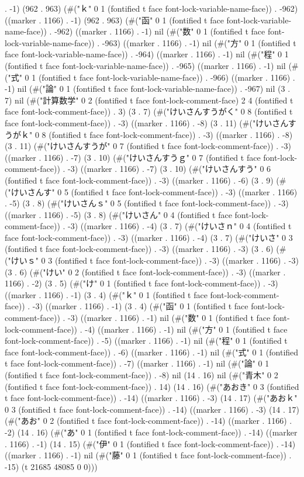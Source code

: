 . -1) (962 . 963) (#("ｋ" 0 1 (fontified t face font-lock-variable-name-face)) . -962) ((marker . 1166) . -1) (962 . 963) (#("函" 0 1 (fontified t face font-lock-variable-name-face)) . -962) ((marker . 1166) . -1) nil (#("数" 0 1 (fontified t face font-lock-variable-name-face)) . -963) ((marker . 1166) . -1) nil (#("方" 0 1 (fontified t face font-lock-variable-name-face)) . -964) ((marker . 1166) . -1) nil (#("程" 0 1 (fontified t face font-lock-variable-name-face)) . -965) ((marker . 1166) . -1) nil (#("式" 0 1 (fontified t face font-lock-variable-name-face)) . -966) ((marker . 1166) . -1) nil (#("論" 0 1 (fontified t face font-lock-variable-name-face)) . -967) nil (3 . 7) nil (#("計算数学" 0 2 (fontified t face font-lock-comment-face) 2 4 (fontified t face font-lock-comment-face)) . 3) (3 . 7) (#("けいさんすうがく" 0 8 (fontified t face font-lock-comment-face)) . -3) ((marker . 1166) . -8) (3 . 11) (#("けいさんすうがｋ" 0 8 (fontified t face font-lock-comment-face)) . -3) ((marker . 1166) . -8) (3 . 11) (#("けいさんすうが" 0 7 (fontified t face font-lock-comment-face)) . -3) ((marker . 1166) . -7) (3 . 10) (#("けいさんすうｇ" 0 7 (fontified t face font-lock-comment-face)) . -3) ((marker . 1166) . -7) (3 . 10) (#("けいさんすう" 0 6 (fontified t face font-lock-comment-face)) . -3) ((marker . 1166) . -6) (3 . 9) (#("けいさんす" 0 5 (fontified t face font-lock-comment-face)) . -3) ((marker . 1166) . -5) (3 . 8) (#("けいさんｓ" 0 5 (fontified t face font-lock-comment-face)) . -3) ((marker . 1166) . -5) (3 . 8) (#("けいさん" 0 4 (fontified t face font-lock-comment-face)) . -3) ((marker . 1166) . -4) (3 . 7) (#("けいさｎ" 0 4 (fontified t face font-lock-comment-face)) . -3) ((marker . 1166) . -4) (3 . 7) (#("けいさ" 0 3 (fontified t face font-lock-comment-face)) . -3) ((marker . 1166) . -3) (3 . 6) (#("けいｓ" 0 3 (fontified t face font-lock-comment-face)) . -3) ((marker . 1166) . -3) (3 . 6) (#("けい" 0 2 (fontified t face font-lock-comment-face)) . -3) ((marker . 1166) . -2) (3 . 5) (#("け" 0 1 (fontified t face font-lock-comment-face)) . -3) ((marker . 1166) . -1) (3 . 4) (#("ｋ" 0 1 (fontified t face font-lock-comment-face)) . -3) ((marker . 1166) . -1) (3 . 4) (#("函" 0 1 (fontified t face font-lock-comment-face)) . -3) ((marker . 1166) . -1) nil (#("数" 0 1 (fontified t face font-lock-comment-face)) . -4) ((marker . 1166) . -1) nil (#("方" 0 1 (fontified t face font-lock-comment-face)) . -5) ((marker . 1166) . -1) nil (#("程" 0 1 (fontified t face font-lock-comment-face)) . -6) ((marker . 1166) . -1) nil (#("式" 0 1 (fontified t face font-lock-comment-face)) . -7) ((marker . 1166) . -1) nil (#("論" 0 1 (fontified t face font-lock-comment-face)) . -8) nil (14 . 16) nil (#("青木" 0 2 (fontified t face font-lock-comment-face)) . 14) (14 . 16) (#("あおき" 0 3 (fontified t face font-lock-comment-face)) . -14) ((marker . 1166) . -3) (14 . 17) (#("あおｋ" 0 3 (fontified t face font-lock-comment-face)) . -14) ((marker . 1166) . -3) (14 . 17) (#("あお" 0 2 (fontified t face font-lock-comment-face)) . -14) ((marker . 1166) . -2) (14 . 16) (#("あ" 0 1 (fontified t face font-lock-comment-face)) . -14) ((marker . 1166) . -1) (14 . 15) (#("伊" 0 1 (fontified t face font-lock-comment-face)) . -14) ((marker . 1166) . -1) nil (#("藤" 0 1 (fontified t face font-lock-comment-face)) . -15) (t 21685 48085 0 0)))

